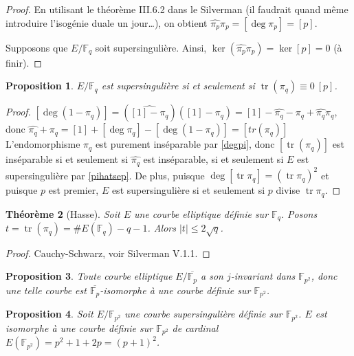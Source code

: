 \documentclass{article}
\theoremstyle{plain}%
\newtheorem{thm}{Théorème}[section]
\newtheorem{prop}[thm]{Proposition}
\theoremstyle{definition}%
\newcommand{\F}{\mathbb{F}}
\DeclareMathOperator{\tr}{tr}
\begin{document}
\begin{proof}
   En utilisant le théorème III.6.2 dans le Silverman (il faudrait quand même introduire l'isogénie duale un jour\ldots), on obtient $\widehat{\pi_p} \pi_p = [\deg \pi_p] = [p]$.

  Supposons que $E/\F_q$ soit supersingulière. Ainsi, $\ker (\widehat{\pi_p}\pi_p) = \ker [p] = 0$ (à finir).
\end{proof}

\begin{prop}
  \label{pimodp}
  $E/\F_q$ est supersingulière si et seulement si $\tr(\pi_q) \equiv 0\ [p]$. 
\end{prop}

\begin{proof}
  $[\deg(1-\pi_q)] = (\widehat{[1] - \pi_q})([1]-\pi_q) = [1] - \widehat{\pi_q} - \pi_q + \widehat{\pi_q}\pi_q  $, donc $ \widehat{\pi_q} + \pi_q = [1] + [\deg\pi_q] - [\deg(1-\pi_q)] = [tr(\pi_q)]  $ 
  L'endomorphisme $\pi_q$ est purement inséparable par \ref{degpi}, donc $[\tr(\pi_q)]$ est inséparable si et seulement si $\widehat{\pi_q}$ est inséparable, si et seulement si $E$ est supersingulière par \ref{pihatsep}. De plus, puisque $\deg[\tr \pi_q] =(\tr \pi_q)^2$ et puisque $p$ est premier, $E$ est supersingulière si et seulement si $p$ divise $\tr\pi_q$. 
\end{proof}


\begin{thm}[Hasse]
  \label{hasse}
  Soit $E$ une courbe elliptique définie sur $\F_q$. Posons $t = \tr(\pi_q) = \# E(\F_q) - q -1$. Alors $|t| \le 2\sqrt{q}$.
\end{thm}

\begin{proof}
  Cauchy-Schwarz, voir Silverman V.1.1.  
\end{proof}

\begin{prop}
  Toute courbe elliptique $E/\overline{\F_p}$ a son $j$-invariant dans $\F_{p^2}$, donc une telle courbe est $\overline{\F_p}$-isomorphe à une courbe définie sur $\F_{p^2}$. 
\end{prop}

\begin{prop}
\label{cardsuper} 
  Soit $E/\F_{p^2}$ une courbe supersingulière définie sur $\F_{p^2}$. $E$ est isomorphe à une courbe définie sur $\F_{p^2}$ de cardinal $E(\F_{p^2}) = p^2 + 1 + 2p = (p+1)^2$.
\end{prop}
\end{document}
